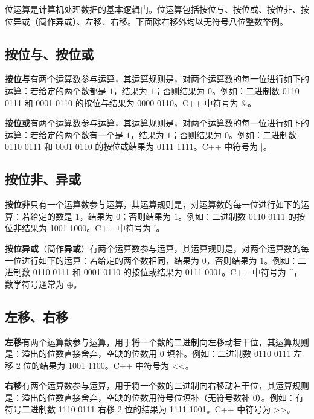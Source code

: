 位运算是计算机处理数据的基本逻辑门。位运算包括按位与、按位或、按位非、按位异或（简作异或）、左移、右移。下面除右移外均以无符号八位整数举例。

\subsection{按位与、按位或}

\textbf{按位与}有两个运算数参与运算，其运算规则是，对两个运算数的每一位进行如下的运算：若给定的两个数都是 $1$，结果为 $1$；否则结果为 $0$。例如：二进制数 0110 0111 和 0001 0110 的按位与结果为 0000 0110。C++ 中符号为 \&。

\textbf{按位或}有两个运算数参与运算，其运算规则是，对两个运算数的每一位进行如下的运算：若给定的两个数有一个是 $1$，结果为 $1$；否则结果为 $0$。例如：二进制数 0110 0111 和 0001 0110 的按位或结果为 0111 1111。C++ 中符号为 |。

\subsection{按位非、异或}

\textbf{按位非}只有一个运算数参与运算，其运算规则是，对运算数的每一位进行如下的运算：若给定的数是 $1$，结果为 $0$；否则结果为 $1$。例如：二进制数 0110 0111 的按位非结果为 1001 1000。C++ 中符号为 $!$。

\textbf{按位异或}（简作\textbf{异或}）有两个运算数参与运算，其运算规则是，对两个运算数的每一位进行如下的运算：若给定的两个数相同，结果为 $0$，否则结果为 $1$。例如：二进制数 0110 0111 和 0001 0110 的按位或结果为 0111 0001。C++ 中符号为 \^{}，数学符号通常为 $\oplus$。

\subsection{左移、右移}

\textbf{左移}有两个运算数参与运算，用于将一个数的二进制向左移动若干位，其运算规则是：溢出的位数直接舍弃，空缺的位数用 0 填补。例如：二进制数 0110 0111 左移 2 位的结果为 1001 1100。C++ 中符号为 <<。

\textbf{右移}有两个运算数参与运算，用于将一个数的二进制向右移动若干位，其运算规则是：溢出的位数直接舍弃，空缺的位数用符号位填补（无符号数补 0）。例如：有符号二进制数 1110 0111 右移 2 位的结果为 1111 1001。C++ 中符号为 >>。